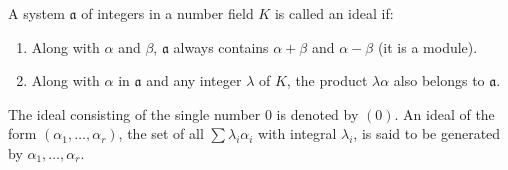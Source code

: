 A system $\mathfrak{a}$ of integers in a number field $K$ is called an ideal if:
\begin{enumerate}
\item[(1)] Along with $\alpha$ and $\beta$, $\mathfrak{a}$ always contains $\alpha + \beta$ and $\alpha - \beta$ (it is a module).
\item[(2)] Along with $\alpha$ in $\mathfrak{a}$ and any integer $\lambda$ of $K$, the product $\lambda\alpha$ also belongs to $\mathfrak{a}$.
\end{enumerate}
The ideal consisting of the single number $0$ is denoted by $(0)$. An ideal of the form $(\alpha_1, \ldots, \alpha_r)$, the set of all $\sum \lambda_i \alpha_i$ with integral $\lambda_i$, is said to be generated by $\alpha_1, \ldots, \alpha_r$.
